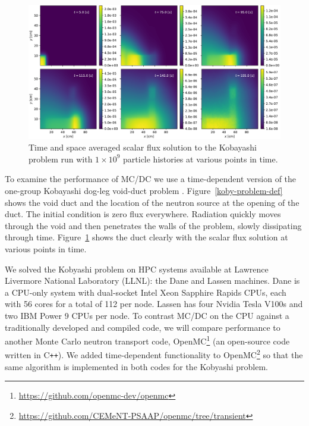 \begin{figure}[h]
    \centerline{
    \includegraphics[width=\textwidth]{figures/cise_figs/koby.pdf}
    } 
    \caption{Time and space averaged scalar flux solution to the Kobayashi problem run with $1\times 10^{9}$ particle histories at various points in time.}
    \label{koby-results}
\end{figure}

To examine the performance of MC/DC we use a time-dependent version of the one-group Kobayashi dog-leg void-duct problem \cite{Kobayashi2001, variansyah_mc23_mcdc}.
Figure~\ref{koby-problem-def} shows the void duct and the location of the neutron source at the opening of the duct.
The initial condition is zero flux everywhere.
Radiation quickly moves through the void and then penetrates the walls of the problem, slowly dissipating through time.
Figure~\ref{koby-results} shows the duct clearly with the scalar flux solution at various points in time.

We solved the Kobyashi problem on HPC systems available at Lawrence Livermore National Laboratory (LLNL): the Dane and Lassen machines.
Dane is a CPU-only system with dual-socket Intel Xeon Sapphire Rapids CPUs, each with 56 cores for a total of 112 per node.
Lassen has four Nvidia Tesla V100s and two IBM Power 9 CPUs per node.
To contrast MC/DC on the CPU against a traditionally developed and compiled code, we will compare performance to another Monte Carlo neutron transport code, OpenMC\footnote{\url{https://github.com/openmc-dev/openmc}} \cite{romano_openmc_2015} (an open-source code written in C\texttt{++}).
We added time-dependent functionality to OpenMC\footnote{\url{https://github.com/CEMeNT-PSAAP/openmc/tree/transient}} so that the same algorithm is implemented in both codes for the Kobyashi problem.


